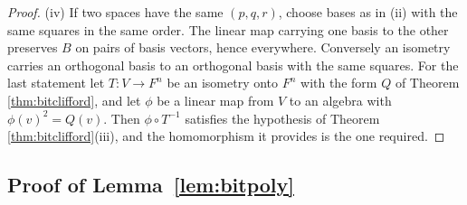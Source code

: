 \documentclass[11pt]{article}
\theoremstyle{plain}
\theoremstyle{definition}
\theoremstyle{plain}
\theoremstyle{definition}
\begin{document}
\begin{proof}
(iv) If two spaces have the same $(p,q,r)$, choose bases as in (ii) with the same squares in the same order. The linear map carrying one basis to the other preserves $B$ on pairs of basis vectors, hence everywhere. Conversely an isometry carries an orthogonal basis to an orthogonal basis with the same squares. For the last statement let $T : V \to F^{n}$ be an isometry onto $F^{n}$ with the form $Q$ of Theorem \ref{thm:bitclifford}, and let $\phi$ be a linear map from $V$ to an algebra with $\phi(v)^{2} = Q(v)$. Then $\phi \circ T^{-1}$ satisfies the hypothesis of Theorem \ref{thm:bitclifford}(iii), and the homomorphism it provides is the one required.
\end{proof}

\subsection{\texorpdfstring{Proof of Lemma~\ref{lem:bitpoly}}{Proof of Lemma 6.2}}\label{prf:lem:bitpoly}
\end{document}
